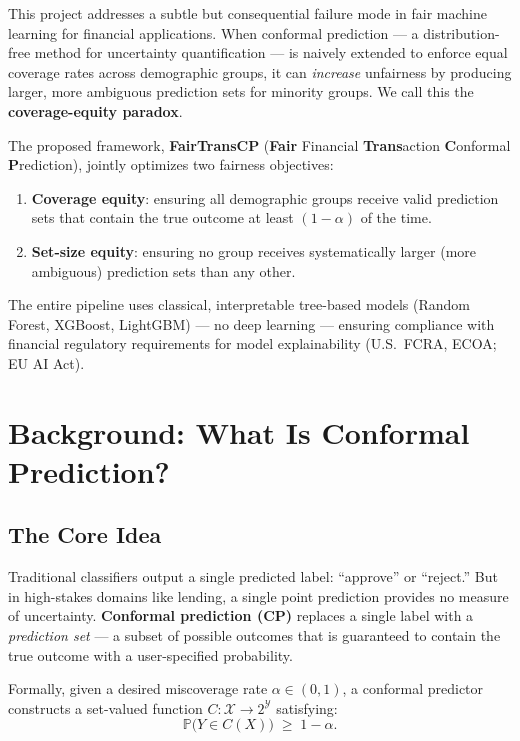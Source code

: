 \documentclass[11pt,a4paper]{article}
\begin{document}
This project addresses a subtle but consequential failure mode in fair machine learning for financial applications. When conformal prediction --- a distribution-free method for uncertainty quantification --- is naively extended to enforce equal coverage rates across demographic groups, it can \emph{increase} unfairness by producing larger, more ambiguous prediction sets for minority groups. We call this the \textbf{coverage-equity paradox}.

The proposed framework, \textbf{FairTransCP} (\textbf{Fair} Financial \textbf{Trans}action \textbf{C}onformal \textbf{P}rediction), jointly optimizes two fairness objectives:
\begin{enumerate}[leftmargin=2em]
    \item \textbf{Coverage equity}: ensuring all demographic groups receive valid prediction sets that contain the true outcome at least $(1-\alpha)$ of the time.
    \item \textbf{Set-size equity}: ensuring no group receives systematically larger (more ambiguous) prediction sets than any other.
\end{enumerate}

The entire pipeline uses classical, interpretable tree-based models (Random Forest, XGBoost, LightGBM) --- no deep learning --- ensuring compliance with financial regulatory requirements for model explainability (U.S.\ FCRA, ECOA; EU AI Act).

\section{Background: What Is Conformal Prediction?}
\label{sec:background}

\subsection{The Core Idea}

Traditional classifiers output a single predicted label: ``approve'' or ``reject.'' But in high-stakes domains like lending, a single point prediction provides no measure of uncertainty. \textbf{Conformal prediction (CP)} replaces a single label with a \emph{prediction set} --- a subset of possible outcomes that is guaranteed to contain the true outcome with a user-specified probability.

Formally, given a desired miscoverage rate $\alpha \in (0,1)$, a conformal predictor constructs a set-valued function $C: \mathcal{X} \to 2^{\mathcal{Y}}$ satisfying:
\begin{equation}
\label{eq:marginal}
\mathbb{P}\bigl(Y \in C(X)\bigr) \;\ge\; 1 - \alpha.
\end{equation}
\end{document}

